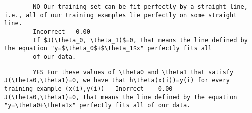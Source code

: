 \documentclass[11pt]{article} %
\begin{document}
		\begin{verbatim}
		NO Our training set can be fit perfectly by a straight line, i.e., all of our training examples lie perfectly on some straight line.	
		Incorrect	0.00	
		If $J(\theta_0, \theta_1)$=0, that means the line defined by the equation "y=$\theta_0$+$\theta_1$x" perfectly fits all
		of our data.
		\end{verbatim}
		
		\begin{verbatim}
		YES For these values of \theta0 and \theta1 that satisfy J(\theta0,\theta1)=0, we have that h\theta(x(i))=y(i) for every training example (x(i),y(i))	Inorrect	0.00	J(\theta0,\theta1)=0, that means the line defined by the equation "y=\theta0+\theta1x" perfectly fits all of our data.
		\end{verbatim}
\end{document}
